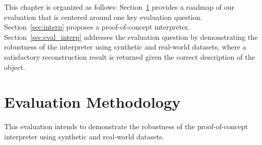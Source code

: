 
This chapter is organized as follows: Section~\ref{sec:interp_eval_methodology} provides a roadmap of our evaluation that is centered around one key evaluation question. Section~\ref{sec:interp} proposes a proof-of-concept interpreter. Section~\ref{sec:eval_interp} addresses the evaluation question by demonstrating the robustness of the interpreter using synthetic and real-world datasets, where a satisfactory reconstruction result is returned given the correct description of the object.


\section{Evaluation Methodology}
\label{sec:interp_eval_methodology}

This evaluation intends to demonstrate the robustness of the proof-of-concept interpreter using synthetic and real-world datasets.

